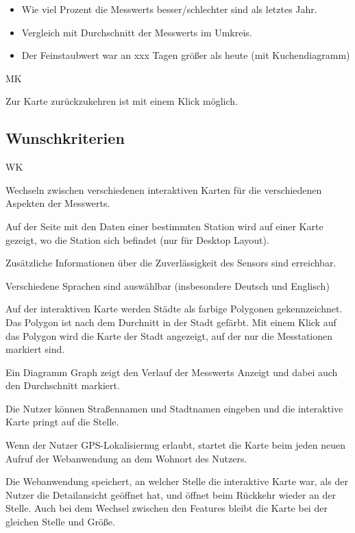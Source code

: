 \begin{itemize}
	\item Wie viel Prozent die \glspl{Messwert} besser/schlechter sind als letztes Jahr.
    \item Vergleich mit Durchschnitt der \glspl{Messwert} im Umkreis.
    \item Der Feinstaubwert war an xxx Tagen größer als heute (mit \gls{Kuchendiagramm})
\end{itemize}

\begin{Kriterien}{MK}	
	\item Zur Karte zurückzukehren ist mit einem Klick möglich.
\end{Kriterien}

\newpage
\subsection{Wunschkriterien}
\setcounter{counter}{10}
\begin{Kriterien}{WK}

	\item Wechseln zwischen verschiedenen interaktiven Karten für die verschiedenen Aspekten der \glspl{Messwert}.

	\item Auf der Seite mit den Daten einer bestimmten \gls{Station} wird auf einer Karte gezeigt, wo die \gls{Station} sich befindet (nur für Desktop Layout). 

	\item Zusätzliche Informationen über die Zuverlässigkeit des Sensors sind erreichbar.

	\item Verschiedene Sprachen sind auswählbar (insbesondere Deutsch und Englisch)
	
	\item Auf der interaktiven Karte werden Städte als farbige Polygonen gekennzeichnet. Das Polygon ist nach dem Durchnitt in der Stadt gefärbt. Mit einem Klick auf das Polygon wird die Karte der Stadt angezeigt, auf der nur die Messtationen markiert sind. 
	
	\item Ein Diagramm  \gls{Graph} zeigt den Verlauf der \glspl{Messwert} Anzeigt und dabei auch den Durchschnitt markiert.
	
	\item Die Nutzer können Straßennamen und Stadtnamen eingeben und die interaktive Karte pringt auf die Stelle.
	
	\item Wenn der Nutzer GPS-Lokalisiernug erlaubt, startet die Karte beim jeden neuen Aufruf der Webanwendung an dem Wohnort des Nutzers.
	
	\item Die Webanwendung speichert, an welcher Stelle die interaktive Karte war, als der Nutzer die Detailansicht geöffnet hat, und öffnet beim Rückkehr wieder an der Stelle. Auch bei dem Wechsel zwischen den Features bleibt die Karte bei der gleichen Stelle und Größe.

\end{Kriterien}

